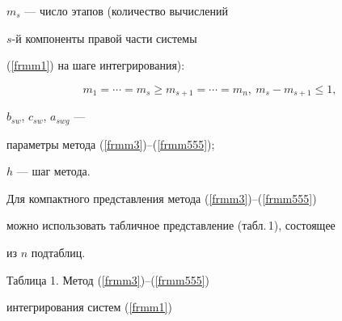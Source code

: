 $m_{s}$ --- число этапов (количество вычислений


$s$-й компоненты правой части системы


(\ref{frmm1}) на шаге интегрирования):


\begin{equation}


m_1=\dotsb =m_{s}\geq m_{s+1}=\dotsb =m_{n},\ m_{s}-m_{s+1}\leq 1,


\label{frmm555}


\end{equation}


$b_{sw}$, $c_{sw}$, $a_{swg}$ --- 


параметры метода (\ref{frmm3})--(\ref{frmm555});\quad


$h$ --- шаг метода.





Для компактного представления метода (\ref{frmm3})--(\ref{frmm555}) 


можно использовать табличное представление (табл.\,1), состоящее


из $n$ подтаблиц.


\smallskip      %





\begin{center}


Таблица 1. Метод (\ref{frmm3})--(\ref{frmm555})


интегрирования систем (\ref{frmm1})


\end{center}





